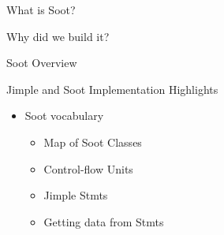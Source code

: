 \begin{slide}{What is Soot?}
\end{slide}

\begin{slide}{Why did we build it?}
\end{slide}

\begin{slide}{Soot Overview}
\end{slide}

\begin{slide}{Jimple and Soot Implementation Highlights}
\begin{itemize}
\item Soot vocabulary
\begin{itemize}
\item Map of Soot Classes
\item Control-flow Units
\item Jimple Stmts
\item Getting data from Stmts
\end{itemize}
\end{itemize}
\end{slide}

